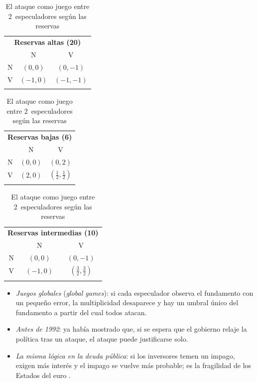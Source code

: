 \documentclass[11pt]{article}
\begin{document}
\begin{table}[H]
\centering
\caption{El ataque como juego entre 2~especuladores según las reservas}\label{tab:juego-ataque}
\begin{tabular}{c|c|c|}
\multicolumn{3}{c}{\textbf{Reservas altas (20)}}\\
\multicolumn{1}{c}{} & \multicolumn{1}{c}{N} & \multicolumn{1}{c}{V}\\ \hhline{~|-|-|}
N & \cellcolor{tceesalvia}$(0,0)$ & $(0,-1)$\\ \hhline{~|-|-|}
V & $(-1,0)$ & $(-1,-1)$\\ \hhline{~|-|-|}
\end{tabular}\quad
\begin{tabular}{c|c|c|}
\multicolumn{3}{c}{\textbf{Reservas bajas (6)}}\\
\multicolumn{1}{c}{} & \multicolumn{1}{c}{N} & \multicolumn{1}{c}{V}\\ \hhline{~|-|-|}
N & $(0,0)$ & $(0,2)$\\ \hhline{~|-|-|}
V & $(2,0)$ & \cellcolor{tceesalvia}$(\tfrac12,\tfrac12)$\\ \hhline{~|-|-|}
\end{tabular}\quad
\begin{tabular}{c|c|c|}
\multicolumn{3}{c}{\textbf{Reservas intermedias (10)}}\\
\multicolumn{1}{c}{} & \multicolumn{1}{c}{N} & \multicolumn{1}{c}{V}\\ \hhline{~|-|-|}
N & \cellcolor{tceesalvia}$(0,0)$ & $(0,-1)$\\ \hhline{~|-|-|}
V & $(-1,0)$ & \cellcolor{tceesalvia}$(\tfrac32,\tfrac32)$\\ \hhline{~|-|-|}
\end{tabular}
\end{table}

\begin{itemize}
\item \emph{Juegos globales} (\emph{global games}): si cada especulador observa el fundamento con un pequeño error, la multiplicidad desaparece y hay un umbral único del fundamento a partir del cual todos atacan\nocite{MorrisShin1998}.
\item \emph{Antes de 1992}: \textcite{Obstfeld1986} ya había mostrado que, si se espera que el gobierno relaje la política tras un ataque, el ataque puede justificarse solo.
\item \emph{La misma lógica en la deuda pública}: si los inversores temen un impago, exigen más interés y el impago se vuelve más probable\nocite{Calvo1988Servicing}; es la fragilidad de los Estados del euro  .
\end{itemize}
\end{document}
